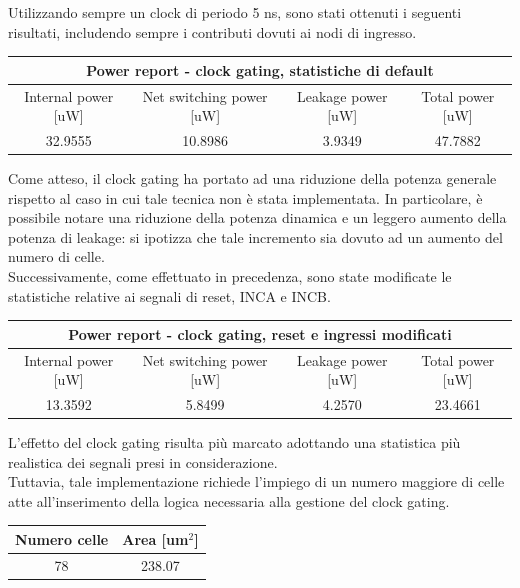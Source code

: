 \documentclass[11pt,  english, makeidx, a4paper, titlepage, oneside]{book}
\begin{document}
Utilizzando sempre un clock di periodo 5 ns, sono stati ottenuti i seguenti risultati, includendo sempre i contributi dovuti ai nodi di ingresso.       
\\
\begin{center}
	\begin{tabular}{|c|c|c|c|}
	\hline
	\multicolumn{4}{|c|}{Power report - clock gating, statistiche di default}\\
	\hline
	Internal power [uW] & Net switching power [uW] & Leakage power [uW] & Total power [uW] \\
	\hline
	 32.9555 & 10.8986  & 3.9349  &  47.7882 \\
	\hline
	\end{tabular}	
\end{center}
\vspace{0.3cm}         
Come atteso, il clock gating ha portato ad una riduzione della potenza generale rispetto al caso in cui tale tecnica non è stata implementata. In particolare, è possibile notare una riduzione della potenza dinamica e un leggero aumento della potenza di leakage: si ipotizza che tale incremento sia dovuto ad un aumento del numero di celle.
\\
Successivamente, come effettuato in precedenza, sono state modificate le statistiche relative ai segnali di reset, INCA e INCB.
\begin{center}
	\begin{tabular}{|c|c|c|c|}
	\hline
	\multicolumn{4}{|c|}{Power report - clock gating, reset e ingressi modificati}\\
	\hline
	Internal power [uW] & Net switching power [uW] & Leakage power [uW] & Total power [uW] \\
	\hline
	 13.3592 & 5.8499  & 4.2570  &  23.4661 \\
	\hline
	\end{tabular}	
\end{center}
\vspace{0.3cm}        
L'effetto del clock gating risulta più marcato adottando una statistica più realistica dei segnali presi in considerazione.
\\
Tuttavia, tale implementazione richiede l'impiego di un numero maggiore di celle atte all'inserimento della logica necessaria alla gestione del clock gating.     
\\
\begin{center}
	\begin{tabular}{|c|c|}
	\hline
	Numero celle & Area [um$^2$] \\
	\hline
	 78 & 238.07 \\
	\hline
	\end{tabular}	
\end{center}
\end{document}
